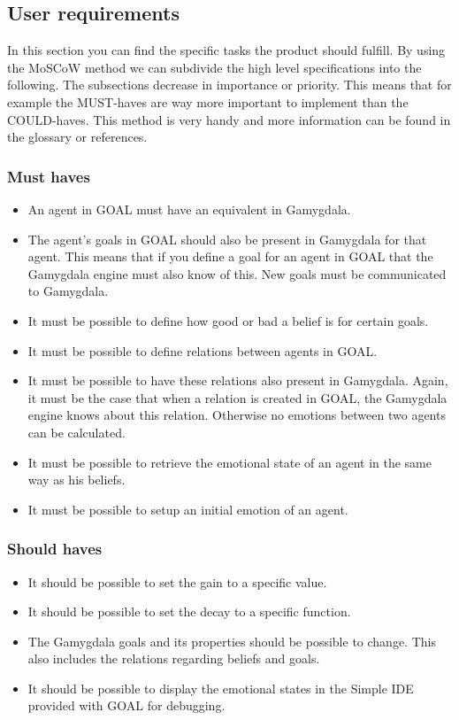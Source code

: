 \documentclass[]{article}
\begin{document}
\subsection{User requirements}
In this section you can find the specific tasks the product should fulfill.
By using the \gls{MoSCoW} method we can subdivide the high level specifications into the following. The subsections decrease in importance or priority. This means that for example the MUST-haves are way more important to implement than the COULD-haves. This method is very handy and more information can be found in the glossary or references.
\subsubsection*{Must haves}
\begin{itemize}
	\item An \gls{agent} in GOAL must have an equivalent in Gamygdala.
	\item The agent's goals in GOAL should also be present in Gamygdala for that agent. This means that if you define a goal for an agent in GOAL that the Gamygdala engine must also know of this. New goals must be communicated to Gamygdala.
	\item It must be possible to define how good or bad a belief is for certain goals.
	\item It must be possible to define relations between agents in GOAL.
	\item It must be possible to have these relations also present in Gamygdala. Again, it must be the case that when a relation is created in GOAL, the Gamygdala engine knows about this relation. Otherwise no emotions between two agents can be calculated.
	\item It must be possible to retrieve the emotional state of an agent in the same way as his beliefs.
	\item It must be possible to setup an initial emotion of an agent.
\end{itemize}
 
\subsubsection*{Should haves}

\begin{itemize}
	\item It should be possible to set the gain to a specific value.
	\item It should be possible to set the decay to a specific function.
	\item The  Gamygdala goals and its properties should be possible to change. This also includes the relations regarding beliefs and goals.
	\item It should be possible to display the emotional states in the Simple IDE\cite{SimpleIDE} provided with GOAL for debugging.
\end{itemize}
\end{document}
